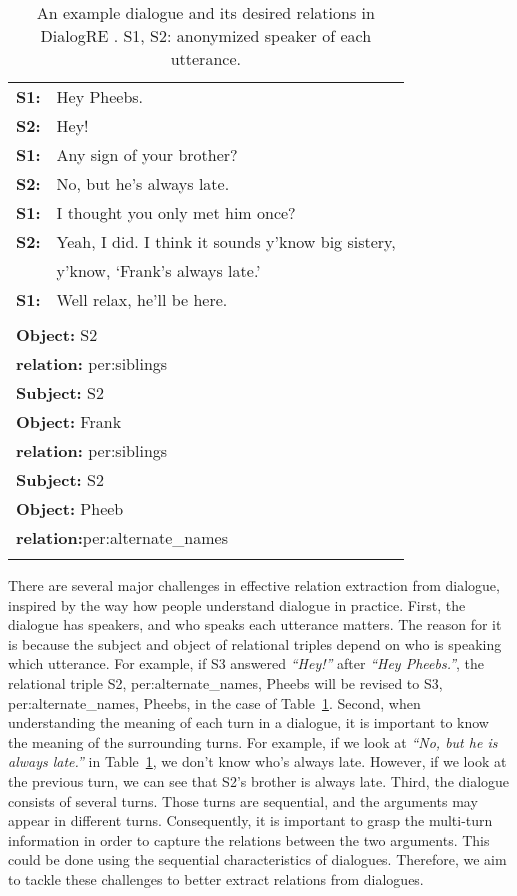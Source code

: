 \documentclass[11pt]{article}
\begin{document}
\begin{table}
\centering
{\small
\begin{tabular}{cl}
\Xhline{3\arrayrulewidth}
\textbf{S1:} & Hey Pheebs. \\
\textbf{S2:} & Hey! \\
\textbf{S1:} & Any sign of your brother? \\
\textbf{S2:} & No, but he’s always late. \\
\textbf{S1:} & I thought you only met him once? \\
\textbf{S2:} & Yeah, I did. I think it sounds y’know big sistery,\\
 & y’know, ‘Frank’s always late.’ \\
\textbf{S1:} & Well relax, he’ll be here. \\
\Xhline{2\arrayrulewidth}
\multicolumn{2}{l}{\textbf{Subject:} Frank} \\
\multicolumn{2}{l}{\textbf{Object:} S2} \\
\multicolumn{2}{l}{\textbf{relation:} per:siblings} \\
\hline
\multicolumn{2}{l}{\textbf{Subject:} S2} \\
\multicolumn{2}{l}{\textbf{Object:} Frank} \\
\multicolumn{2}{l}{\textbf{relation:} per:siblings} \\
\hline
\multicolumn{2}{l}{\textbf{Subject:} S2} \\
\multicolumn{2}{l}{\textbf{Object:} Pheeb} \\
\multicolumn{2}{l}{\textbf{relation:}per:alternate\_names} \\
\Xhline{3\arrayrulewidth}
\end{tabular}
}
\caption{\label{dialogRE-table} An example dialogue and its desired relations in DialogRE \citep{yu-etal-2020-dialogue}. S1, S2: anonymized speaker of each utterance. }
\end{table}

There are several major challenges in effective relation extraction from dialogue, inspired by the way how people understand dialogue in practice. First, the dialogue has speakers, and who speaks each utterance matters. The reason for it is because the subject and object of relational triples depend on who is speaking which utterance. For example, if S3 answered \textit{``Hey!''} after \textit{``Hey Pheebs.''}, the relational triple S2, per:alternate\_names, Pheebs will be revised to S3, per:alternate\_names, Pheebs, in the case of Table~\ref{dialogRE-table}. Second, when understanding the meaning of each turn in a dialogue, it is important to know the meaning of the surrounding turns. For example, if we look at \textit{``No, but he is always late.''} in Table~\ref{dialogRE-table}, we don't know who's always late. However, if we look at the previous turn, we can see that S2's brother is always late. Third, the dialogue consists of several turns. Those turns are sequential, and the arguments may appear in different turns. Consequently, it is important to grasp the multi-turn information in order to capture the relations between the two arguments. This could be done using the sequential characteristics of dialogues. Therefore, we aim to tackle these challenges to better extract relations from dialogues.
\end{document}
